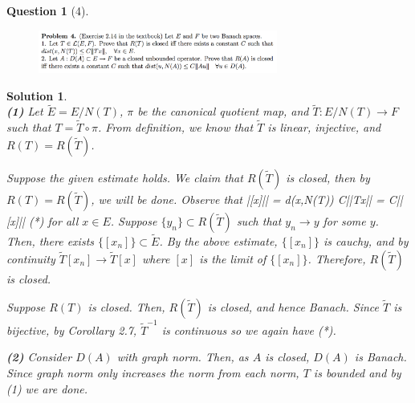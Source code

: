 \documentclass{article} %
\def\eQb#1\eQe{\begin{eqnarray*}#1\end{eqnarray*}}
\theoremstyle{quest}
\newtheorem*{question}{Question}
\newtheorem*{solution}{Solution}
\begin{document}
\newpage

\begin{question}[4]
\hfill
\begin{figure}[h!]
  \centering
    \includegraphics[width=0.7\textwidth]{funcA-h-e2-p4.png}
\end{figure}
\end{question}
\begin{solution} \hfill \\
\textbf{(1)}
Let $\tilde{E} = E / N(T)$, $\pi$ be the canonical quotient map,
and $\tilde{T}:E / N(T) \to F$ such that $T = \tilde{T} \circ \pi$.
From definition, we know that $\tilde{T}$ is linear, injective, and $R(T) 
= R(\tilde{T})$. 

\smallskip

Suppose the given estimate holds. We claim that $R(\tilde{T})$ is closed, then by 
$R(T) = R(\tilde{T})$, we will be done. Observe that 
\eQb
||[x]|| = d(x,N(T)) \leq C||Tx|| = C||[x]|| (*)
\eQe  
for all $x \in E$. Suppose $\{y_n\} \subset R(\tilde{T})$ such that $y_n \to y$ for some
$y$. Then, there exists 
$\{[x_n]\} \subset \tilde{E}$. By the above estimate, $\{[x_n]\}$ is
cauchy, and by continuity $\tilde{T}[x_n] \to \tilde{T}[x]$ where $[x]$ is the
limit of $\{[x_n]\}$. Therefore, $R(\tilde{T})$ is closed. 

Suppose $R(T)$ is closed. Then, $R(\tilde{T})$ is closed, and hence Banach.
Since $\tilde{T}$ is bijective, by Corollary 2.7, $\tilde{T}^{-1}$ is continuous so 
we again have (*).

\bigskip

\textbf{(2)} Consider $D(A)$ with graph norm. Then, as $A$ is closed, $D(A)$ is 
Banach. Since graph norm only increases the norm from each norm, $T$ is bounded
and by (1) we are done.


\end{solution}

\newpage
\end{document}
